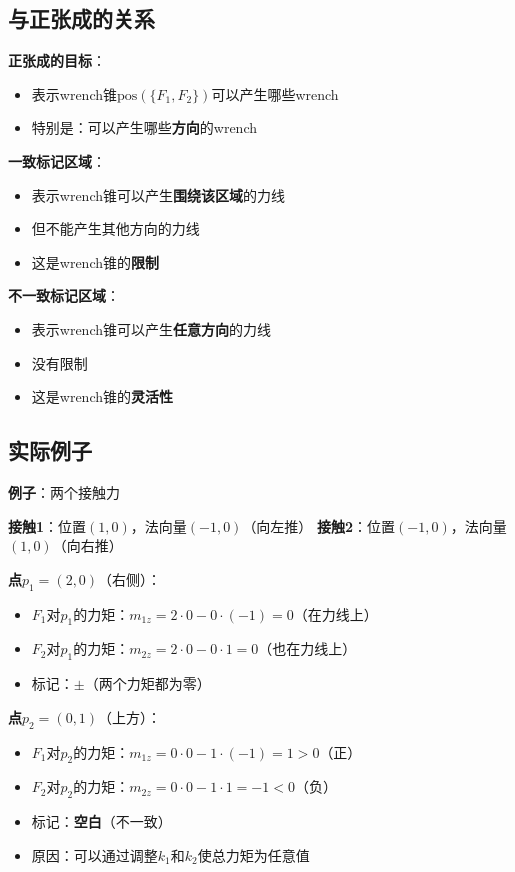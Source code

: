 \documentclass[12pt,a4paper]{article}
\begin{document}
\subsection{与正张成的关系}

\textbf{正张成的目标}：
\begin{itemize}
\item 表示wrench锥$\text{pos}(\{F_1, F_2\})$可以产生哪些wrench
\item 特别是：可以产生哪些\textbf{方向}的wrench
\end{itemize}

\textbf{一致标记区域}：
\begin{itemize}
\item 表示wrench锥可以产生\textbf{围绕该区域}的力线
\item 但不能产生其他方向的力线
\item 这是wrench锥的\textbf{限制}
\end{itemize}

\textbf{不一致标记区域}：
\begin{itemize}
\item 表示wrench锥可以产生\textbf{任意方向}的力线
\item 没有限制
\item 这是wrench锥的\textbf{灵活性}
\end{itemize}

\subsection{实际例子}

\textbf{例子}：两个接触力

\textbf{接触1}：位置$(1, 0)$，法向量$(-1, 0)$（向左推）
\textbf{接触2}：位置$(-1, 0)$，法向量$(1, 0)$（向右推）

\textbf{点$p_1 = (2, 0)$}（右侧）：
\begin{itemize}
\item $F_1$对$p_1$的力矩：$m_{1z} = 2 \cdot 0 - 0 \cdot (-1) = 0$（在力线上）
\item $F_2$对$p_1$的力矩：$m_{2z} = 2 \cdot 0 - 0 \cdot 1 = 0$（也在力线上）
\item 标记：$\pm$（两个力矩都为零）
\end{itemize}

\textbf{点$p_2 = (0, 1)$}（上方）：
\begin{itemize}
\item $F_1$对$p_2$的力矩：$m_{1z} = 0 \cdot 0 - 1 \cdot (-1) = 1 > 0$（正）
\item $F_2$对$p_2$的力矩：$m_{2z} = 0 \cdot 0 - 1 \cdot 1 = -1 < 0$（负）
\item 标记：\textbf{空白}（不一致）
\item 原因：可以通过调整$k_1$和$k_2$使总力矩为任意值
\end{itemize}
\end{document}
